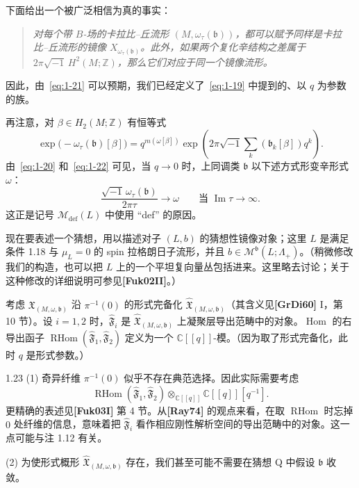 下面给出一个被广泛相信为真的事实：

\begin{quote}\itshape
对每个带 $B$-场的卡拉比--丘流形 $(M,\omega_\tau(\mathfrak b))$，都可以赋予同样是卡拉比--丘流形的镜像 $X_{\omega_\tau(\mathfrak b)}$。此外，如果两个复化辛结构之差属于
$2\pi\sqrt{-1}\,H^2(M;\mathbb Z)$，那么它们对应于同一个镜像流形。
\end{quote}

因此，由~\eqref{eq:1-21} 可以预期，我们已经定义了~\eqref{eq:1-19} 中提到的、以 $q$ 为参数的族。

再注意，对 $\beta\in H_2(M;\mathbb Z)$ 有恒等式
\begin{equation}
  \exp\bigl(-\omega_\tau(\mathfrak b)[\beta]\bigr)
  =q^{m(\omega[\beta])}
   \exp\left(2\pi\sqrt{-1}\sum_k(\mathfrak b_k[\beta])q^k\right).
  \tag{1.22}\label{eq:1-22}
\end{equation}
由~\eqref{eq:1-20} 和~\eqref{eq:1-22} 可见，当 $q\to0$ 时，上同调类 $\mathfrak b$ 以下述方式形变辛形式 $\omega$：
\[
  \frac{\sqrt{-1}\,\omega_\tau(\mathfrak b)}{2\pi\tau}
  \longrightarrow\omega
  \qquad\text{当 }\operatorname{Im}\tau\to\infty.
\]
这正是记号 $\mathcal M_{\mathrm{def}}(L)$ 中使用 ``def'' 的原因。

现在要表述一个猜想，用以描述对子 $(L,b)$ 的猜想性镜像对象；这里 $L$ 是满足条件 1.18 与 $\mu_L=0$ 的 spin 拉格朗日子流形，并且
$b\in\mathcal M^{\mathfrak b}(L;\Lambda_+)$。（稍微修改我们的构造，也可以把 $L$ 上的一个平坦复向量丛包括进来。这里略去讨论；关于这种修改的详细说明可参见\textbf{[Fuk02II]}。）

考虑 $\mathfrak X_{(M,\omega,\mathfrak b)}$ 沿 $\pi^{-1}(0)$ 的形式完备化
$\widehat{\mathfrak X}_{(M,\omega,\mathfrak b)}$（其含义见\textbf{[GrDi60]} I，第 10 节）。设 $i=1,2$ 时，$\hat{\mathfrak F}_i$ 是
$\widehat{\mathfrak X}_{(M,\omega,\mathfrak b)}$ 上凝聚层导出范畴中的对象。$\operatorname{Hom}$ 的右导出函子
$\operatorname{RHom}(\hat{\mathfrak F}_1,\hat{\mathfrak F}_2)$
定义为一个 $\mathbb C[[q]]$-模。（因为取了形式完备化，此时 $q$ 是形式参数。）

\begin{remark}{1.23}\label{rem:1-23}
(1) 奇异纤维 $\pi^{-1}(0)$ 似乎不存在典范选择。因此实际需要考虑
\[
  \operatorname{RHom}(\hat{\mathfrak F}_1,\hat{\mathfrak F}_2)
  \otimes_{\mathbb C[[q]]}\mathbb C[[q]][q^{-1}].
\]
更精确的表述见\textbf{[Fuk03I]} 第 4 节。从\textbf{[Ray74]} 的观点来看，在取 $\operatorname{RHom}$ 时忘掉 $0$ 处纤维的信息，意味着把 $\hat{\mathfrak F}_i$ 看作相应刚性解析空间的导出范畴中的对象。这一点可能与注 1.12 有关。

(2) 为使形式概形 $\widehat{\mathfrak X}_{(M,\omega,\mathfrak b)}$ 存在，我们甚至可能不需要在猜想 Q 中假设 $\mathfrak b$ 收敛。
\end{remark}

